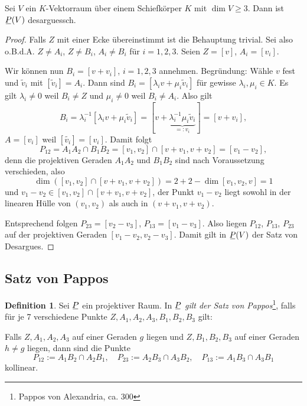 \documentclass[
 a4paper,
 12pt,
 parskip=half
 ]{scrartcl}
\theoremstyle{plain}
\theoremstyle{definition}
\newtheorem*{defn*}{Definition}
\begin{document}
\begin{thm}
 Sei $V$ ein $K$-Vektorraum über einem Schiefkörper $K$ mit $\dim V \ge 3$. Dann ist $\proj(V)$ desarguessch.
\end{thm}

\begin{proof}
 Falls $Z$ mit einer Ecke übereinstimmt ist die Behauptung trivial. Sei also o.B.d.A. $Z \ne A_i$, $Z \ne B_i$, $A_i \ne B_i$ für $i = 1,2,3$. Seien $Z = [v]$, $A_i = [v_i]$. 
 
 Wir können nun $B_i = [v + v_i]$, $i = 1,2,3$ annehmen. Begründung: Wähle $v$ fest und $\tilde{v}_i$ mit $[\tilde{v}_i] = A_i$. Dann sind $B_i = [\lambda_i v + \mu_i \tilde{v}_i]$ für gewisse $\lambda_i, \mu_i \in K$. Es gilt $\lambda_i \ne 0$ weil $B_i \ne Z$ und $\mu_i \ne 0$ weil $B_i \ne A_i$. Also gilt 
 \[ B_i = \lambda_i^{-1} [\lambda_i v + \mu_i \tilde{v}_i] = [v + \underbrace{\lambda_i^{-1} \mu_i \tilde{v}_i}_{=: v_i}] = [v + v_i], \]
 $A = [v_i]$ weil $[\tilde{v_i}] = [v_i]$. Damit folgt 
 \[ P_{12} = A_1 A_2 \cap B_1 B_2 = [v_1 , v_2] \cap [v + v_1, v + v_2 ] = [v_1 - v_2], \]
 denn die projektiven Geraden $A_1 A_2$ und $B_1 B_2$ sind nach Voraussetzung verschieden, also
 \[ \dim( [v_1, v_2] \cap [v + v_1, v + v_2 ] ) = 2 + 2 - \dim[v_1, v_2, v] = 1 \]
 und $v_1 - v_2 \in [v_1, v_2] \cap [v + v_1, v + v_2]$, der Punkt $v_1-v_2$ liegt sowohl in der linearen Hülle von $(v_1, v_2)$ als auch in $(v + v_1, v + v_2)$.

 Entsprechend folgen $P_{23} = [v_2 - v_3]$, $P_{13} = [v_1 - v_3]$. Also liegen $P_{12}$, $P_{13}$, $P_{23}$ auf der projektiven Geraden $[v_1 - v_2, v_2 - v_3]$. Damit gilt in $\proj(V)$ der Satz von Desargues.
\end{proof}

\subsection{Satz von Pappos}
\begin{defn*}
 Sei $\proj$ ein projektiver Raum. In $\proj$ \emph{gilt der Satz von Pappos}\footnote{Pappos von Alexandria, ca. 300}, falls für je 7 verschiedene Punkte $Z, A_1, A_2, A_3, B_1, B_2, B_3$ gilt:
 \begin{addmargin}[.5cm]{0cm} 
 Falls $Z, A_1, A_2, A_3$ auf einer Geraden $g$ liegen und $Z, B_1, B_2, B_3$ auf einer Geraden $h \ne g$ liegen, dann sind die Punkte 
 \[ P_{12} := A_1 B_2 \cap A_2 B_1, \quad P_{23} := A_2 B_3 \cap A_3 B_2, \quad P_{13} := A_1 B_3 \cap A_3 B_1 \]
 kollinear.
 \end{addmargin}
\end{defn*}
\end{document}
